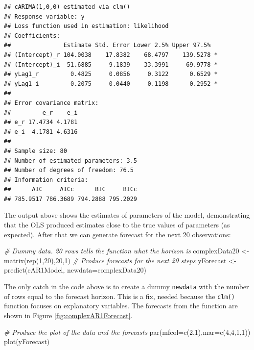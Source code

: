 \documentclass[
]{book}
\newenvironment{Shaded}{\begin{snugshade}}{\end{snugshade}}
\newcommand{\AttributeTok}[1]{\textcolor[rgb]{0.77,0.63,0.00}{#1}}
\newcommand{\CommentTok}[1]{\textcolor[rgb]{0.56,0.35,0.01}{\textit{#1}}}
\newcommand{\DecValTok}[1]{\textcolor[rgb]{0.00,0.00,0.81}{#1}}
\newcommand{\FunctionTok}[1]{\textcolor[rgb]{0.00,0.00,0.00}{#1}}
\newcommand{\NormalTok}[1]{#1}
\newcommand{\OtherTok}[1]{\textcolor[rgb]{0.56,0.35,0.01}{#1}}
\begin{document}
\begin{verbatim}
## cARIMA(1,0,0) estimated via clm()
## Response variable: y
## Loss function used in estimation: likelihood
## Coefficients:
##               Estimate Std. Error Lower 2.5% Upper 97.5%  
## (Intercept)_r 104.0038    17.8382    68.4797    139.5278 *
## (Intercept)_i  51.6885     9.1839    33.3991     69.9778 *
## yLag1_r         0.4825     0.0856     0.3122      0.6529 *
## yLag1_i         0.2075     0.0440     0.1198      0.2952 *
## 
## Error covariance matrix:
##         e_r    e_i
## e_r 17.4734 4.1781
## e_i  4.1781 4.6316
## 
## Sample size: 80
## Number of estimated parameters: 3.5
## Number of degrees of freedom: 76.5
## Information criteria:
##      AIC     AICc      BIC     BICc 
## 785.9517 786.3689 794.2888 795.2029
\end{verbatim}

The output above shows the estimates of parameters of the model, demonstrating that the OLS produced estimates close to the true values of parameters (as expected). After that we can generate forecast for the next 20 observations:

\begin{Shaded}
\begin{Highlighting}[]
\CommentTok{\# Dummy data. 20 rows tells the function what the horizon is}
\NormalTok{complexData20 }\OtherTok{\textless{}{-}} \FunctionTok{matrix}\NormalTok{(}\FunctionTok{rep}\NormalTok{(}\DecValTok{1}\NormalTok{,}\DecValTok{20}\NormalTok{),}\DecValTok{20}\NormalTok{,}\DecValTok{1}\NormalTok{)}
\CommentTok{\# Produce forecasts for the next 20 steps}
\NormalTok{yForecast }\OtherTok{\textless{}{-}} \FunctionTok{predict}\NormalTok{(cAR1Model, }\AttributeTok{newdata=}\NormalTok{complexData20)}
\end{Highlighting}
\end{Shaded}

The only catch in the code above is to create a dummy \texttt{newdata} with the number of rows equal to the forecast horizon. This is a fix, needed because the \texttt{clm()} function focuses on explanatory variables. The forecasts from the function are shown in Figure \ref{fig:complexAR1Forecast}.

\begin{Shaded}
\begin{Highlighting}[]
\CommentTok{\# Produce the plot of the data and the forecasts}
\FunctionTok{par}\NormalTok{(}\AttributeTok{mfcol=}\FunctionTok{c}\NormalTok{(}\DecValTok{2}\NormalTok{,}\DecValTok{1}\NormalTok{),}\AttributeTok{mar=}\FunctionTok{c}\NormalTok{(}\DecValTok{4}\NormalTok{,}\DecValTok{4}\NormalTok{,}\DecValTok{1}\NormalTok{,}\DecValTok{1}\NormalTok{))}
\FunctionTok{plot}\NormalTok{(yForecast)}
\end{Highlighting}
\end{Shaded}
\end{document}
